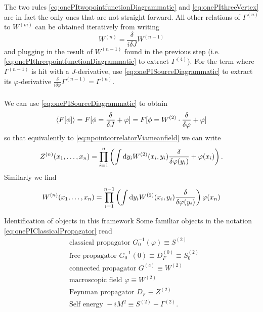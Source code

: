  The two rules \ref{eq:onePItwopointfunctionDiagrammatic} and \ref{eq:onePIthreeVertex} are in fact the only ones that are not straight forward. All other relations of $\Gamma^{(n)}$ to $W^{(m)}$ can be obtained iteratively from writing 
 \begin{equation}
 	W^{(n)} = \frac{\delta}{i\delta J} W^{(n-1)}
 \end{equation}
 and plugging in the result of $W^{(n-1)}$ found in the previous step (i.e. \ref{eq:onePIthreepointfunctionDiagrammatic} to extract $\Gamma^{(4)}$). For the term where $\Gamma^{(n-1)}$ is hit with a $J$-derivative, use \ref{eq:onePISourceDiagrammatic} to extract its $\varphi$-derivative $\frac{\delta}{i\delta \varphi} \Gamma^{(n-1)} = \Gamma^{(n)}$.\\
 \\
 We can use \ref{eq:onePISourceDiagrammatic} to obtain
 \begin{equation}
 \label{eq:reference2}
 	\expval{F[\phi]} = F[\phi=\frac{\delta}{\delta J}+\varphi] = F[\phi=W^{(2)} \cdot \frac{\delta}{\delta \varphi} +\varphi]
 \end{equation}
 so that equivalently to \ref{eq:npointcorrelatorViameanfield} we can write
 \begin{equation}
 	Z^{(n)} (x_1,\dots,x_n) = \prod_{i=1}^{n} \left(\int \mathrm{d} y_i W^{(2)}(x_i,y_i) \frac{\delta}{\delta \varphi(y_i)} + \varphi(x_i)\right).
 \end{equation}
 Similarly we find
 \begin{equation}
 	W^{(n)}(x_1,\dots,x_n) = \prod_{i=1}^{n-1} \left(\int \mathrm{d} y_i W^{(2)} (x_i,y_i) \frac{\delta}{\delta \varphi(y_i)}\right) \varphi(x_n)
 \end{equation}
 \begin{mybox}{Identification of objects in this framework}
 	Some familiar objects in the notation \ref{eq:onePIClassicalPropagator} read
 	\begin{subequations}
 		\begin{align}
 			&\text{classical propagator } G^{-1}_0(\varphi) \equiv S^{(2)} \\
 			&\text{free propagator } G^{-1}_0(0) \equiv D^{(0)}_F \equiv S^{(2)}_0 \\
 			&\text{connected propagator } G^{(c)} \equiv W^{(2)} \\
 			&\text{macroscopic field } \varphi \equiv W^{(2)}\\
 			&\text{Feynman propagator } D_F \equiv Z^{(2)} \\
 			&\text{Self energy } -iM^2 \equiv S^{(2)} - \Gamma^{(2)}.
 		\end{align}
 	\end{subequations}
 \end{mybox}
